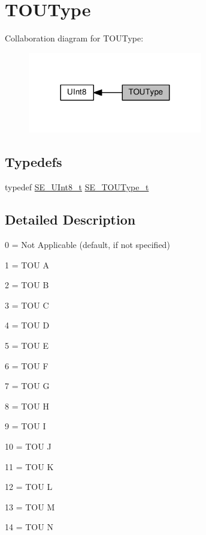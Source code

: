 \hypertarget{group__TOUType}{}\section{T\+O\+U\+Type}
\label{group__TOUType}
Collaboration diagram for T\+O\+U\+Type\+:\nopagebreak
\begin{figure}[H]
\begin{center}
\leavevmode
\includegraphics[width=216pt]{group__TOUType}
\end{center}
\end{figure}
\subsection*{Typedefs}
\begin{DoxyCompactItemize}
\item 
typedef \hyperlink{group__UInt8_gaf7c365a1acfe204e3a67c16ed44572f5}{S\+E\+\_\+\+U\+Int8\+\_\+t} \hyperlink{group__TOUType_gadcfd871f87df34ae8228b9484ebedc6a}{S\+E\+\_\+\+T\+O\+U\+Type\+\_\+t}
\end{DoxyCompactItemize}


\subsection{Detailed Description}
0 = Not Applicable (default, if not specified)

1 = T\+OU A

2 = T\+OU B

3 = T\+OU C

4 = T\+OU D

5 = T\+OU E

6 = T\+OU F

7 = T\+OU G

8 = T\+OU H

9 = T\+OU I

10 = T\+OU J

11 = T\+OU K

12 = T\+OU L

13 = T\+OU M

14 = T\+OU N

